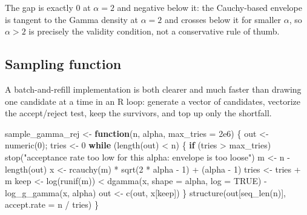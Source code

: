 \documentclass[
  letterpaper,
  DIV=11,
  numbers=noendperiod]{scrreprt}
\newenvironment{Shaded}{\begin{snugshade}}{\end{snugshade}}
\newcommand{\AttributeTok}[1]{\textcolor[rgb]{0.40,0.45,0.13}{#1}}
\newcommand{\ConstantTok}[1]{\textcolor[rgb]{0.56,0.35,0.01}{#1}}
\newcommand{\ControlFlowTok}[1]{\textcolor[rgb]{0.00,0.23,0.31}{\textbf{#1}}}
\newcommand{\DecValTok}[1]{\textcolor[rgb]{0.68,0.00,0.00}{#1}}
\newcommand{\FloatTok}[1]{\textcolor[rgb]{0.68,0.00,0.00}{#1}}
\newcommand{\FunctionTok}[1]{\textcolor[rgb]{0.28,0.35,0.67}{#1}}
\newcommand{\NormalTok}[1]{\textcolor[rgb]{0.00,0.23,0.31}{#1}}
\newcommand{\OtherTok}[1]{\textcolor[rgb]{0.00,0.23,0.31}{#1}}
\newcommand{\SpecialCharTok}[1]{\textcolor[rgb]{0.37,0.37,0.37}{#1}}
\newcommand{\StringTok}[1]{\textcolor[rgb]{0.13,0.47,0.30}{#1}}
\begin{document}
The gap is exactly \(0\) at \(\alpha = 2\) and negative below it: the
Cauchy-based envelope is tangent to the Gamma density at \(\alpha = 2\)
and crosses below it for smaller \(\alpha\), so \(\alpha > 2\) is
precisely the validity condition, not a conservative rule of thumb.

\subsection{Sampling function}\label{sampling-function}

A batch-and-refill implementation is both clearer and much faster than
drawing one candidate at a time in an R loop: generate a vector of
candidates, vectorize the accept/reject test, keep the survivors, and
top up only the shortfall.

\begin{Shaded}
\begin{Highlighting}[]
\NormalTok{sample\_gamma\_rej }\OtherTok{\textless{}{-}} \ControlFlowTok{function}\NormalTok{(n, alpha, }\AttributeTok{max\_tries =} \FloatTok{2e6}\NormalTok{) \{}
\NormalTok{    out }\OtherTok{\textless{}{-}} \FunctionTok{numeric}\NormalTok{(}\DecValTok{0}\NormalTok{); tries }\OtherTok{\textless{}{-}} \DecValTok{0}
    \ControlFlowTok{while}\NormalTok{ (}\FunctionTok{length}\NormalTok{(out) }\SpecialCharTok{\textless{}}\NormalTok{ n) \{}
        \ControlFlowTok{if}\NormalTok{ (tries }\SpecialCharTok{\textgreater{}}\NormalTok{ max\_tries) }\FunctionTok{stop}\NormalTok{(}\StringTok{"acceptance rate too low for this alpha: envelope is too loose"}\NormalTok{)}
\NormalTok{        m }\OtherTok{\textless{}{-}}\NormalTok{ n }\SpecialCharTok{{-}} \FunctionTok{length}\NormalTok{(out)}
\NormalTok{        x }\OtherTok{\textless{}{-}} \FunctionTok{rcauchy}\NormalTok{(m) }\SpecialCharTok{*} \FunctionTok{sqrt}\NormalTok{(}\DecValTok{2} \SpecialCharTok{*}\NormalTok{ alpha }\SpecialCharTok{{-}} \DecValTok{1}\NormalTok{) }\SpecialCharTok{+}\NormalTok{ (alpha }\SpecialCharTok{{-}} \DecValTok{1}\NormalTok{)}
\NormalTok{        tries }\OtherTok{\textless{}{-}}\NormalTok{ tries }\SpecialCharTok{+}\NormalTok{ m}
\NormalTok{        keep }\OtherTok{\textless{}{-}} \FunctionTok{log}\NormalTok{(}\FunctionTok{runif}\NormalTok{(m)) }\SpecialCharTok{\textless{}} \FunctionTok{dgamma}\NormalTok{(x, }\AttributeTok{shape =}\NormalTok{ alpha, }\AttributeTok{log =} \ConstantTok{TRUE}\NormalTok{) }\SpecialCharTok{{-}} \FunctionTok{log\_g\_gamma}\NormalTok{(x, alpha)}
\NormalTok{        out }\OtherTok{\textless{}{-}} \FunctionTok{c}\NormalTok{(out, x[keep])}
\NormalTok{    \}}
    \FunctionTok{structure}\NormalTok{(out[}\FunctionTok{seq\_len}\NormalTok{(n)], }\AttributeTok{accept.rate =}\NormalTok{ n }\SpecialCharTok{/}\NormalTok{ tries)}
\NormalTok{\}}
\end{Highlighting}
\end{Shaded}
\end{document}
